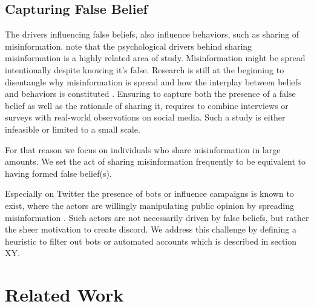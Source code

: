 \documentclass[
10pt, %
a4paper, %
oneside, %
headinclude,footinclude, %
] {book}%
\begin{document}
\section{Capturing False Belief}

The drivers influencing false beliefs, also influence behaviors, such as sharing of misinformation. \cite{psychological_drivers_misinformation} note that the psychological drivers behind sharing misinformation is a highly related area of study. Misinformation might be spread intentionally despite knowing it's false. Research is still at the beginning to disentangle why misinformation is spread and how the interplay between beliefs and behaviors is constituted \citep{van2021political}. Ensuring to capture both the presence of a false belief as well as the rationale of sharing it, requires to combine interviews or surveys with real-world observations on social media. Such a study is either infeasible or limited to a small scale. 

For that reason we focus on individuals who share misinformation in large amounts. We set the act of sharing misinformation frequently to be equivalent to having formed false belief(s).

Especially on Twitter the presence of bots or influence campaigns is known to exist, where the actors are willingly manipulating public opinion by spreading misinformation \citep{stukal2017detecting}. Such actors are not necessarily driven by false beliefs, but rather the sheer motivation to create discord. We address this challenge by defining a heuristic to filter out bots or automated accounts which is described in section XY.



\chapter{Related Work}
\label{chp:related_work}
\end{document}
